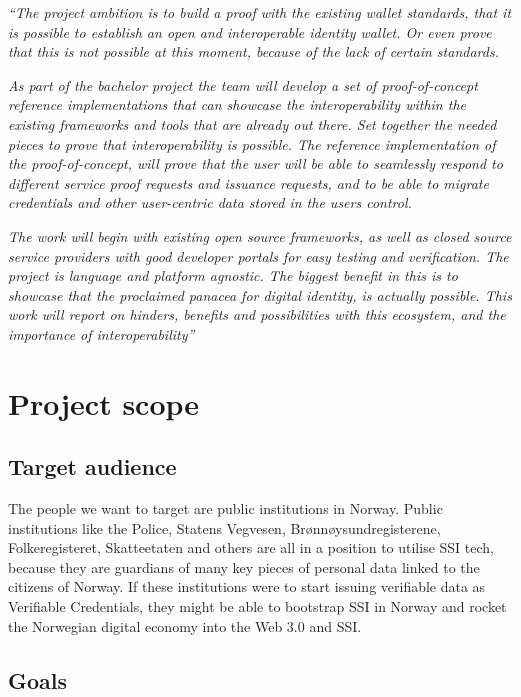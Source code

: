 \emph{``The project ambition is to build a proof with the existing
wallet standards, that it is possible to establish an open and
interoperable identity wallet. Or even prove that this is not possible
at this moment, because of the lack of certain standards.}

\emph{As part of the bachelor project the team will develop a set of
proof-of-concept reference implementations that can showcase the
interoperability within the existing frameworks and tools that are
already out there. Set together the needed pieces to prove that
interoperability is possible. The reference implementation of the
proof-of-concept, will prove that the user will be able to seamlessly
respond to different service proof requests and issuance requests, and
to be able to migrate credentials and other user-centric data stored in
the users control.}

\emph{The work will begin with existing open source frameworks, as well
as closed source service providers with good developer portals for easy
testing and verification. The project is language and platform agnostic.
The biggest benefit in this is to showcase that the proclaimed panacea
for digital identity, is actually possible. This work will report on
hinders, benefits and possibilities with this ecosystem, and the
importance of interoperability''}

\hypertarget{project-scope}{%
\section{Project scope}\label{project-scope}}

\hypertarget{target-audience}{%
\subsection{Target audience}\label{target-audience}}

The people we want to target are public institutions in Norway. Public
institutions like the Police, Statens Vegvesen, Brønnøysundregisterene,
Folkeregisteret, Skatteetaten and others are all in a position to
utilise SSI tech, because they are guardians of many key pieces of
personal data linked to the citizens of Norway. If these institutions
were to start issuing verifiable data as Verifiable Credentials, they
might be able to bootstrap SSI in Norway and rocket the Norwegian
digital economy into the Web 3.0 and SSI.


\hypertarget{goals}{%
\subsection{Goals}\label{goals}}

